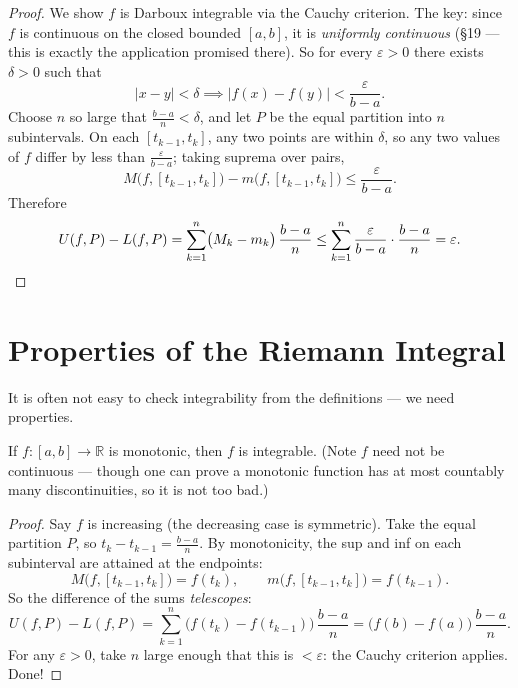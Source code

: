 \documentclass[11pt]{report}
\begin{document}
\begin{proof}
We show $f$ is Darboux integrable via the Cauchy criterion. The key: since $f$ is continuous on the closed bounded $[a,b]$, it is \emph{uniformly continuous} (\S 19 --- this is exactly the application promised there). So for every $\varepsilon > 0$ there exists $\delta > 0$ such that
\[
|x - y| < \delta \implies |f(x) - f(y)| < \frac{\varepsilon}{b-a}.
\]
Choose $n$ so large that $\tfrac{b-a}{n} < \delta$, and let $P$ be the equal partition into $n$ subintervals. On each $[t_{k-1}, t_k]$, any two points are within $\delta$, so any two values of $f$ differ by less than $\tfrac{\varepsilon}{b-a}$; taking suprema over pairs,
\[
M\bigl(f,[t_{k-1},t_k]\bigr) - m\bigl(f,[t_{k-1},t_k]\bigr) \leq \frac{\varepsilon}{b-a}.
\]
Therefore
\[
U(f,P) - L(f,P) = \sum_{k=1}^n \bigl(M_k - m_k\bigr)\,\frac{b-a}{n} \leq \sum_{k=1}^n \frac{\varepsilon}{b-a}\cdot\frac{b-a}{n} = \varepsilon. \qedhere
\]
\end{proof}


\section{Properties of the Riemann Integral}

It is often not easy to check integrability from the definitions --- we need properties.

\begin{thmbox}
If $f: [a,b] \to \mathbb{R}$ is monotonic, then $f$ is integrable. (Note $f$ need not be continuous --- though one can prove a monotonic function has at most countably many discontinuities, so it is not too bad.)
\end{thmbox}

\begin{proof}
Say $f$ is increasing (the decreasing case is symmetric). Take the equal partition $P$, so $t_k - t_{k-1} = \tfrac{b-a}{n}$. By monotonicity, the sup and inf on each subinterval are attained at the endpoints:
\[
M\bigl(f, [t_{k-1},t_k]\bigr) = f(t_k), \qquad m\bigl(f, [t_{k-1},t_k]\bigr) = f(t_{k-1}).
\]
So the difference of the sums \emph{telescopes}:
\[
U(f,P) - L(f,P) = \sum_{k=1}^n \bigl( f(t_k) - f(t_{k-1}) \bigr)\, \frac{b-a}{n} = \bigl( f(b) - f(a) \bigr)\, \frac{b-a}{n}.
\]
For any $\varepsilon > 0$, take $n$ large enough that this is $< \varepsilon$: the Cauchy criterion applies. Done!
\end{proof}
\end{document}
